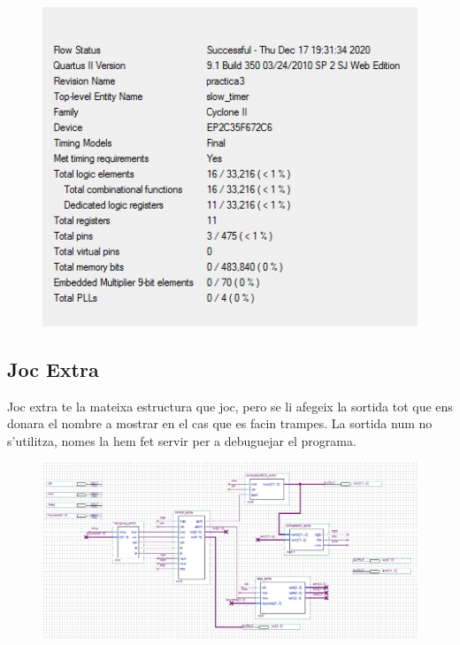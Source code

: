 \documentclass[12pt, a4papre]{article}
\begin{document}
	
	\begin{figure}[H]
			
		\begin{center}
		\includegraphics[width=130mm]{informeSlowTimer.jpeg}
		\end{center}
	\end{figure}
\subsection{Joc Extra}

	Joc extra te la mateixa estructura que joc, pero se li afegeix la sortida tot que ens donara el nombre a mostrar en el cas que es facin trampes. La sortida num no s'utilitza, nomes la hem fet servir per a debuguejar el programa.

	\begin{figure}[H]			
		\begin{center}
		\includegraphics[width=130mm]{jocExtra.jpeg}
		\end{center}
	\end{figure}
	
\end{document}
